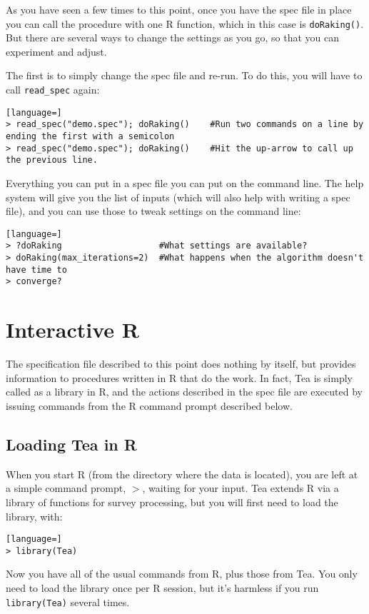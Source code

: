 \documentclass{article}
\begin{document}
{As you have seen a few times to this point, once you have the spec file in place you can
call the procedure with one R function, which in this case is {\tt doRaking()}. But there
are several ways to change the settings as you go, so that you can experiment and adjust.

The first is to simply change the spec file and re-run. To do this, you will have to call
{\tt read\_spec} again:
\begin{lstlisting}[language=]
> read_spec("demo.spec"); doRaking()    #Run two commands on a line by ending the first with a semicolon
> read_spec("demo.spec"); doRaking()    #Hit the up-arrow to call up the previous line.
\end{lstlisting}

Everything you can put in a spec file you can put on the command line. The help system
will give you the list of inputs (which will also help with writing a spec file), and you
can use those to tweak settings on the command line:
\begin{lstlisting}[language=]
> ?doRaking                   #What settings are available?
> doRaking(max_iterations=2)  #What happens when the algorithm doesn't have time to
> converge?
\end{lstlisting}
} %


\section{Interactive R}\label{rsec}
The specification file described to this point does nothing by itself, but provides
information to procedures written in R that do the work. In fact, Tea is simply 
called as a library in R, and the actions described in the spec file are executed by
issuing commands from the R command prompt described below.

\subsection{Loading Tea in R}
When you start R (from the directory where the data is located), you are left at a
simple command prompt, $>$, waiting for your input. Tea extends R via a library of
functions for survey processing, but you will first need to load the library, with:
\begin{lstlisting}[language=]
> library(Tea)
\end{lstlisting}

Now you have all of the usual commands from R, plus those from Tea. You only
need to load the library once per R session, but it's harmless if you run
{\tt library(Tea)} several times.
\end{document}
